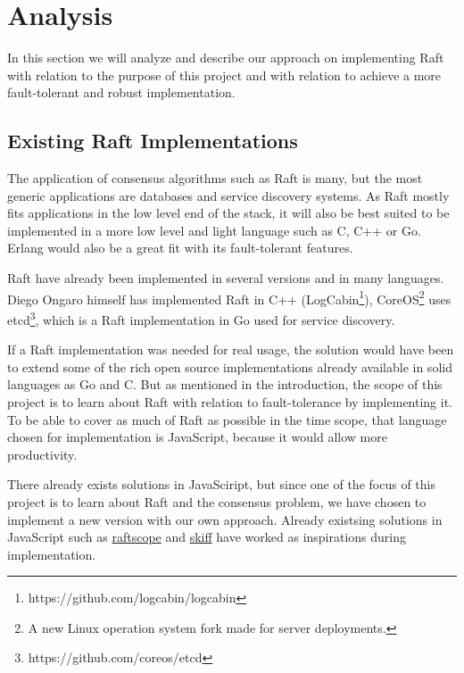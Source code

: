 \section{Analysis} %
\label{sec:analysis}

In this section we will analyze and describe our approach on implementing Raft with relation to the purpose of this project and with relation to achieve a more fault-tolerant and robust implementation.

\subsection{Existing Raft Implementations} %
\label{sub:existing_raft_implementations}

The application of consensus algorithms such as Raft is many, but the most generic applications are databases and service discovery systems. As Raft mostly fits applications in the low level end of the stack, it will also be best suited to be implemented in a more low level and light language such as C, C++ or Go. Erlang would also be a great fit with its fault-tolerant features.

Raft have already been implemented in several versions and in many languages. Diego Ongaro himself has implemented Raft in C++ (LogCabin\footnote{https://github.com/logcabin/logcabin}), CoreOS\footnote{A new Linux operation system fork made for server deployments.} uses etcd\footnote{https://github.com/coreos/etcd}, which is a Raft implementation in Go used for service discovery.

If a Raft implementation was needed for real usage, the solution would have been to extend some of the rich open source implementations already available in solid languages as Go and C. But as mentioned in the introduction, the scope of this project is to learn about Raft with relation to fault-tolerance by implementing it. To be able to cover as much of Raft as possible in the time scope, that language chosen for implementation is JavaScript, because it would allow more productivity.

There already exists solutions in JavaSciript, but since one of the focus of this project is to learn about Raft and the consensus problem, we have chosen to implement a new version with our own approach. Already existsing solutions in JavaScript such as \href{https://github.com/ongardie/raftscope}{raftscope} and \href{https://github.com/pgte/skiff-algorithm}{skiff} have worked as inspirations during implementation.

